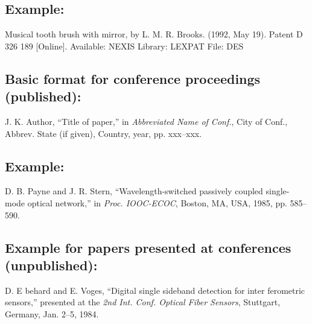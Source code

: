 \documentclass[journal]{IEEEtai}
\begin{document}
\subsection*{Example:}\vspace*{-12pt}

\begin{thebibliography}{34}
\setcounter{enumiv}{20}

\bibitem{}Musical tooth brush with mirror, by L. M. R. Brooks. (1992, May 19). Patent D 326 189
[Online]. Available: NEXIS Library: LEXPAT File:   DES 
\end{thebibliography}


\subsection*{Basic format for conference proceedings (published):}\vspace*{-12pt}
\begin{thebibliography}{34}
\item[] J. K. Author, ``Title of paper,'' in {\em Abbreviated Name of Conf.}, City of Conf., Abbrev. State (if given), Country, year, pp. xxx--xxx.
\end{thebibliography}

\subsection*{Example:}\vspace*{-12pt}

\begin{thebibliography}{34}
\setcounter{enumiv}{21}

\bibitem{}D. B. Payne and J. R. Stern, ``Wavelength-switched passively coupled single-mode optical network,'' in {\em Proc. IOOC-ECOC}, Boston, MA, USA, 1985,
pp. 585--590. 

\end{thebibliography}

\subsection*{Example for papers presented at conferences (unpublished):}\vspace*{-12pt}

\begin{thebibliography}{34}
\setcounter{enumiv}{22}

\bibitem{}D. E behard and E. Voges, ``Digital single sideband detection for inter ferometric sensors,'' presented at the {\em 2nd Int. Conf. Optical Fiber Sensors}, Stuttgart, Germany, Jan. 2--5, 1984.
\end{thebibliography}
\end{document}
